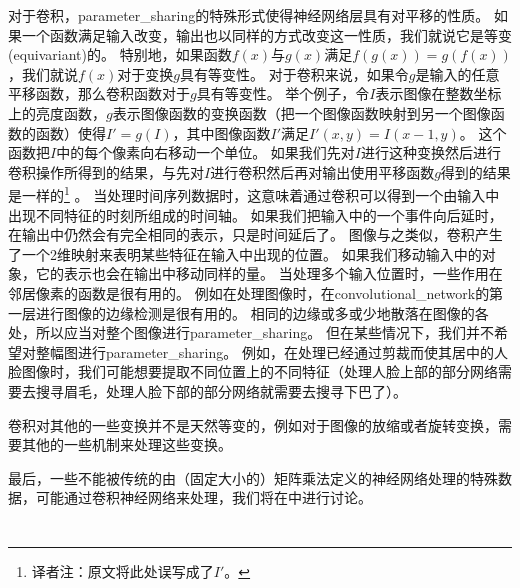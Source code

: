 对于卷积，\gls{parameter_sharing}的特殊形式使得神经网络层具有对平移的性质。
如果一个函数满足输入改变，输出也以同样的方式改变这一性质，我们就说它是等变(equivariant)的。
特别地，如果函数$f(x)$与$g(x)$满足$f(g(x))= g(f(x))$，我们就说$f(x)$对于变换$g$具有等变性。
对于卷积来说，如果令$g$是输入的任意平移函数，那么卷积函数对于$g$具有等变性。
举个例子，令$I$表示图像在整数坐标上的亮度函数，$g$表示图像函数的变换函数（把一个图像函数映射到另一个图像函数的函数）使得$I' = g(I)$，其中图像函数$I'$满足$I'(x,y) = I(x-1, y)$。
这个函数把$I$中的每个像素向右移动一个单位。
如果我们先对$I$进行这种变换然后进行卷积操作所得到的结果，与先对$I$进行卷积然后再对输出使用平移函数$g$得到的结果是一样的\footnote{译者注：原文将此处误写成了$I'$。} 。%
当处理时间序列数据时，这意味着通过卷积可以得到一个由输入中出现不同特征的时刻所组成的时间轴。
如果我们把输入中的一个事件向后延时，在输出中仍然会有完全相同的表示，只是时间延后了。
图像与之类似，卷积产生了一个2维映射来表明某些特征在输入中出现的位置。
如果我们移动输入中的对象，它的表示也会在输出中移动同样的量。
当处理多个输入位置时，一些作用在邻居像素的函数是很有用的。
例如在处理图像时，在\gls{convolutional_network}的第一层进行图像的边缘检测是很有用的。
相同的边缘或多或少地散落在图像的各处，所以应当对整个图像进行\gls{parameter_sharing}。
但在某些情况下，我们并不希望对整幅图进行\gls{parameter_sharing}。
例如，在处理已经通过剪裁而使其居中的人脸图像时，我们可能想要提取不同位置上的不同特征（处理人脸上部的部分网络需要去搜寻眉毛，处理人脸下部的部分网络就需要去搜寻下巴了）。

 
卷积对其他的一些变换并不是天然等变的，例如对于图像的放缩或者旋转变换，需要其他的一些机制来处理这些变换。

最后，一些不能被传统的由（固定大小的）矩阵乘法定义的神经网络处理的特殊数据，可能通过卷积神经网络来处理，我们将在中进行讨论。

\section{}
\label{sec:pooling}

